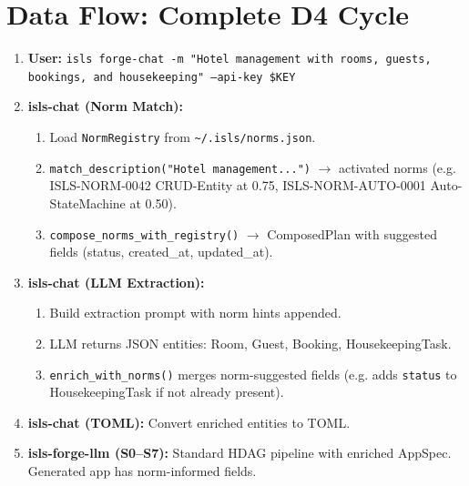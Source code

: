 \documentclass[11pt,a4paper]{article}
\begin{document}
\section{Data Flow: Complete D4 Cycle}

\begin{enumerate}
\item \textbf{User:} \texttt{isls forge-chat -m "Hotel management 
      with rooms, guests, bookings, and housekeeping" --api-key \$KEY}

\item \textbf{isls-chat (Norm Match):}
      \begin{enumerate}[nosep,label=\alph*.]
      \item Load \texttt{NormRegistry} from \texttt{\textasciitilde/.isls/norms.json}.
      \item \texttt{match\_description("Hotel management...")} $\to$ 
            activated norms (e.g. ISLS-NORM-0042 CRUD-Entity at 0.75, 
            ISLS-NORM-AUTO-0001 Auto-StateMachine at 0.50).
      \item \texttt{compose\_norms\_with\_registry()} $\to$ ComposedPlan 
            with suggested fields (status, created\_at, updated\_at).
      \end{enumerate}

\item \textbf{isls-chat (LLM Extraction):}
      \begin{enumerate}[nosep,label=\alph*.]
      \item Build extraction prompt with norm hints appended.
      \item LLM returns JSON entities: Room, Guest, Booking, 
            HousekeepingTask.
      \item \texttt{enrich\_with\_norms()} merges norm-suggested fields 
            (e.g. adds \texttt{status} to HousekeepingTask if not already 
            present).
      \end{enumerate}

\item \textbf{isls-chat (TOML):} Convert enriched entities to TOML.

\item \textbf{isls-forge-llm (S0--S7):} Standard HDAG pipeline with 
      enriched AppSpec. Generated app has norm-informed fields.


\end{enumerate}
\end{document}
